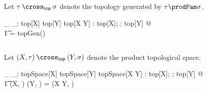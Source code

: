 \documentclass{amsart}
\begin{document}
\subsection{}

Let $\tau \prodTop \sigma$ denote the topology generated by $\tau \prodFam \sigma$.

\begin{gendef}[X,Y]
	\_ \prodTop \_: top[X] \cross top[Y] \fun top[X \cross Y]
\where
	\forall \tau: top[X]; \sigma: top[Y] @ \\
	\t1	\tau \prodTop \sigma = topGen(\tau \prodFam \sigma)
\end{gendef}

\subsection{}

Let $(X, \tau) \prodTop (Y, \sigma)$ denote the product topological space.

\begin{gendef}[X,Y]
	\_ \prodTopSp \_: topSpace[X] \cross topSpace[Y] \fun topSpace[X \cross Y]
\where
	\forall \tau: top[X]; \sigma: top[Y] @ \\
	\t1	(X, \tau) \prodTopSp (Y, \sigma) = (X \cross Y, \tau \prodTop \sigma)
\end{gendef}

\printbibliography
\end{document}
